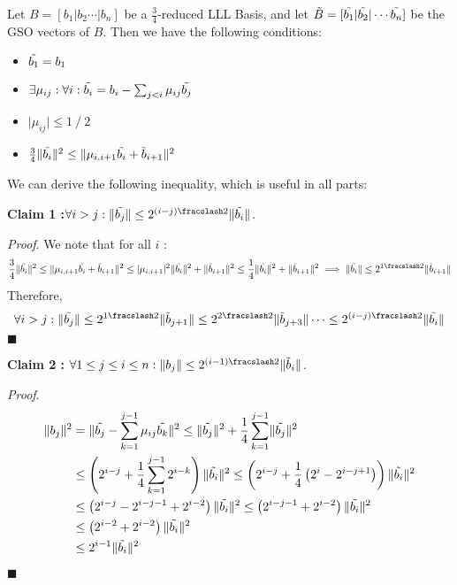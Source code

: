 Let $B = [b_1 | b_2 \cdots | b_n]$ be a $\frac{3}{4}$-reduced LLL Basis, and let $\Tilde{B} = [\Tilde{b_1} | \Tilde{b_2} | \cdots \Tilde{b_n} ]$ be the GSO vectors of $B$. Then we have the following conditions:

\begin{itemize}
    \item $\Tilde{b_1} = b_1$
    \item $\exists \mu_{ij}: \forall i: \Tilde{b_i} = b_i - \sum_{j < i} \mu_{ij} \Tilde{b_j}$
    \item $\lvert \mu_{ij} \rvert \le 1 \fracslash 2$
    \item $\frac{3}{4} \lVert \Tilde{b_i} \rVert^2 \le \lVert \mu_{i,i+1} \Tilde{b_i} + \Tilde{b}_{i+1} \rVert^2$
\end{itemize}

We can derive the following inequality, which is useful in all parts:

\begin{thisnote1}
    \textbf{Claim 1 :}$\forall i>j: \lVert \Tilde{b_j} \rVert \le 2^{(i-j)\fracslash 2} \lVert \Tilde{b_i} \rVert$.
    
    \textit{Proof}. We note that for all $i$ : 
    \begin{gather*}
    \frac{3}{4} \lVert \Tilde{b_i} \rVert^2 \le \lVert \mu_{i,i+1} \Tilde{b_i} + \Tilde{b}_{i+1} \rVert^2 \le \lvert \mu_{i,i+1} \rvert^2 \lVert \Tilde{b_i} \rVert^2 + \lVert \Tilde{b}_{i+1} \rVert^2  \le  \frac{1}{4} \lVert \Tilde{b_i} \rVert^2 + \lVert \Tilde{b}_{i+1} \rVert^2 \implies \lVert \Tilde{b_i} \rVert \le  2^{1 \fracslash 2} \lVert \Tilde{b}_{i+1} \rVert
\end{gather*}
Therefore, 
\[
\forall i>j: \lVert \Tilde{b_j} \rVert \le 2^{1 \fracslash 2} \lVert \Tilde{b}_{j+1} \rVert \le 2^{2 \fracslash 2} \lVert \Tilde{b}_{j+3} \rVert \cdots \le 2^{(i-j) \fracslash 2} \lVert \Tilde{b_i} \rVert
\]
\hfill $\blacksquare$
\end{thisnote1}

\begin{thisnote1}
    \textbf{Claim 2 : } $\forall 1 \le j \le i \le n: \lVert b_j \rVert \le 2^{(i-1) \fracslash 2} \lVert \Tilde{b}_i \rVert$.

    \textit{Proof}. 
    \begin{align*}
    \lVert b_j \rVert^2 &= \lVert \Tilde{b_j} - \sum_{k = 1}^{j-1} \mu_{ij} \Tilde{b_k} \rVert^2 \le \lVert \Tilde{b_j} \rVert^2 + \frac{1}{4} \sum_{k = 1}^{j-1} \lVert \Tilde{b_j} \rVert^2 \\
    &\le \left(2^{i-j} + \frac{1}{4}\sum_{k = 1}^{j-1} 2^{i-k}\right) \lVert \Tilde{b_i} \rVert^2 \le \left(2^{i-j} + \frac{1}{4} \left(2^i - 2^{i-j+1}\right)\right) \lVert \Tilde{b_i} \rVert^2 \\
    &\le \left(2^{i-j} - 2^{i-j-1} + 2^{i-2}\right) \lVert \Tilde{b_i} \rVert^2 \le \left(2^{i-j-1} + 2^{i-2}\right) \lVert \Tilde{b_i} \rVert^2 \\
    &\le \left(2^{i-2} + 2^{i-2}\right) \lVert \Tilde{b_i} \rVert^2 \\
    &\le 2^{i-1} \lVert \Tilde{b_i} \rVert^2
\end{align*}

\hfill $\blacksquare$
\end{thisnote1}

